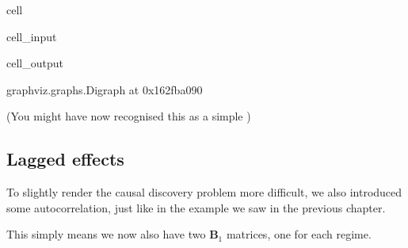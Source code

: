 \documentclass[letterpaper,10pt,english]{jupyterBook}
\begin{document}
\begin{sphinxuseclass}{cell}\begin{sphinxVerbatimInput}

\begin{sphinxuseclass}{cell_input}
\begin{sphinxVerbatim}[commandchars=\\\{\}]
  \PYG{p}{[}\PYG{p}{[}  \PYG{p}{]}
              \PYG{p}{[}  \PYG{p}{]}
              \PYG{p}{[} \PYG{p}{]}\PYG{p}{]}

\end{sphinxVerbatim}

\end{sphinxuseclass}\end{sphinxVerbatimInput}
\begin{sphinxVerbatimOutput}

\begin{sphinxuseclass}{cell_output}
\begin{sphinxVerbatim}[commandchars=\\\{\}]
\PYGZlt{}graphviz.graphs.Digraph at 0x162fba090\PYGZgt{}
\end{sphinxVerbatim}

\end{sphinxuseclass}\end{sphinxVerbatimOutput}

\end{sphinxuseclass}
\sphinxAtStartPar
(You might have now recognised this as a simple )


\subsection{Lagged effects}
\label{\detokenize{notebooks/structural_breaks_example:lagged-effects}}
\sphinxAtStartPar
To slightly render the causal discovery problem more difficult, we also introduced some autocorrelation, just like in the  example we saw in the previous chapter.

\sphinxAtStartPar
This simply means we now also have two \(\mathbf{B}_1\) matrices, one for each regime.
\end{document}
